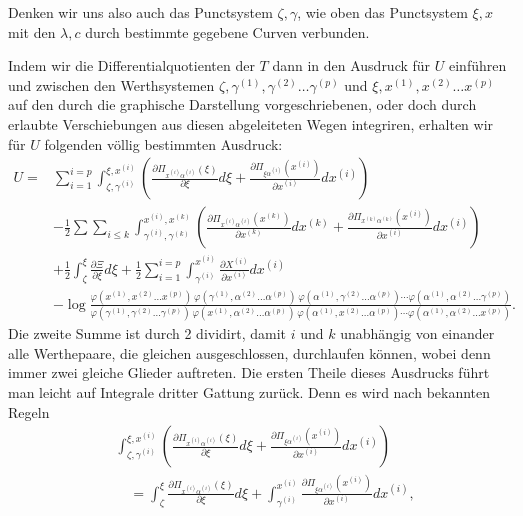 \documentclass[10pt]{article}
\begin{document}
Denken wir uns also auch das Punctsystem \(\zeta,\gamma\), wie oben das Punctsystem \(\xi,x\) mit den \(\lambda,c\) durch bestimmte gegebene Curven verbunden.

Indem wir die Differentialquotienten der \(T\) dann in den Ausdruck für \(U\) einführen und zwischen den Werthsystemen \(\zeta,\gamma^{(1)},\gamma^{(2)}\ldots\gamma^{(p)}\) und \(\xi,x^{(1)},x^{(2)}\ldots x^{(p)}\) auf den durch die graphische Darstellung vorgeschriebenen, oder doch durch erlaubte Verschiebungen aus diesen abgeleiteten Wegen integriren, erhalten wir für \(U\) folgenden völlig bestimmten Ausdruck:
\begingroup\scriptsize
\[
\begin{aligned}
U={}&\sum_{i=1}^{i=p}\int_{\zeta,\gamma^{(i)}}^{\xi,x^{(i)}}
\left(\frac{\partial\Pi_{x^{(i)}\alpha^{(i)}}(\xi)}{\partial\xi}d\xi
+\frac{\partial\Pi_{\xi\alpha^{(i)}}(x^{(i)})}{\partial x^{(i)}}dx^{(i)}\right)\\
&-\frac12\sum\sum_{i\le k}\int_{\gamma^{(i)},\gamma^{(k)}}^{x^{(i)},x^{(k)}}
\left(\frac{\partial\Pi_{x^{(i)}\alpha^{(i)}}(x^{(k)})}{\partial x^{(k)}}dx^{(k)}
+\frac{\partial\Pi_{x^{(k)}\alpha^{(k)}}(x^{(i)})}{\partial x^{(i)}}dx^{(i)}\right)\\
&+\frac12\int_{\zeta}^{\xi}\frac{\partial\Xi}{\partial\xi}d\xi
+\frac12\sum_{i=1}^{i=p}\int_{\gamma^{(i)}}^{x^{(i)}}\frac{\partial X^{(i)}}{\partial x^{(i)}}dx^{(i)}\\
&-\log\frac{\varphi(x^{(1)},x^{(2)}\ldots x^{(p)})\,\varphi(\gamma^{(1)},\alpha^{(2)}\ldots\alpha^{(p)})\,\varphi(\alpha^{(1)},\gamma^{(2)}\ldots\alpha^{(p)})\cdots\varphi(\alpha^{(1)},\alpha^{(2)}\ldots\gamma^{(p)})}
{\varphi(\gamma^{(1)},\gamma^{(2)}\ldots\gamma^{(p)})\,\varphi(x^{(1)},\alpha^{(2)}\ldots\alpha^{(p)})\,\varphi(\alpha^{(1)},x^{(2)}\ldots\alpha^{(p)})\cdots\varphi(\alpha^{(1)},\alpha^{(2)}\ldots x^{(p)})}.
\end{aligned}
\]
\endgroup
Die zweite Summe ist durch 2 dividirt, damit \(i\) und \(k\) unabhängig von einander alle Werthepaare, die gleichen ausgeschlossen, durchlaufen können, wobei denn immer zwei gleiche Glieder auftreten. Die ersten Theile dieses Ausdrucks führt man leicht auf Integrale dritter Gattung zurück. Denn es wird nach bekannten Regeln
\begingroup\footnotesize
\[
\begin{aligned}
&\int_{\zeta,\gamma^{(i)}}^{\xi,x^{(i)}}
\left(\frac{\partial\Pi_{x^{(i)}\alpha^{(i)}}(\xi)}{\partial\xi}d\xi
+\frac{\partial\Pi_{\xi\alpha^{(i)}}(x^{(i)})}{\partial x^{(i)}}dx^{(i)}\right)\\
&\quad=\int_{\zeta}^{\xi}\frac{\partial\Pi_{x^{(i)}\alpha^{(i)}}(\xi)}{\partial\xi}d\xi
+\int_{\gamma^{(i)}}^{x^{(i)}}\frac{\partial\Pi_{\xi\alpha^{(i)}}(x^{(i)})}{\partial x^{(i)}}dx^{(i)},
\end{aligned}
\]
\end{document}

